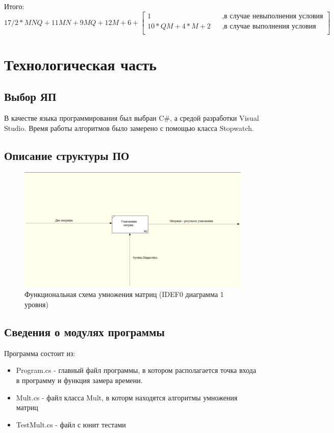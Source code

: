\documentclass[12pt]{report}
\begin{document}
Итого: $17/2 * MNQ + 11MN + 9MQ + 12M + 6 + 
       \begin{bmatrix}
             1    &&, \text{в случае невыполнения условия}\\
             10*QM + 4*M + 2 &&, \text{в случае выполнения условия}\\
           \end{bmatrix} $ \\



\chapter{Технологическая часть}
\section{Выбор ЯП}
В качестве языка программирования был выбран C\#, а средой разработки Visual Studio. 
Время работы алгоритмов было замерено с помощью класса Stopwatch.

\section{Описание структуры ПО}
\begin{figure}[h]
\centering
\includegraphics[width=1\linewidth]{idef}
\caption{Функциональная схема умножения матриц (IDEF0 диаграмма 1 уровня)}
\label{fig:mpr}
\end{figure}

\section{Сведения о модулях программы}
Программа состоит из:
\begin{itemize}
	\item Program.cs - главный файл программы, в котором располагается точка входа в программу и функция замера времени.
	\item Mult.cs - файл класса Mult, в которм находятся алгоритмы умножения матриц
	\item TestMult.cs - файл с юнит тестами
\end{itemize}
\end{document}
